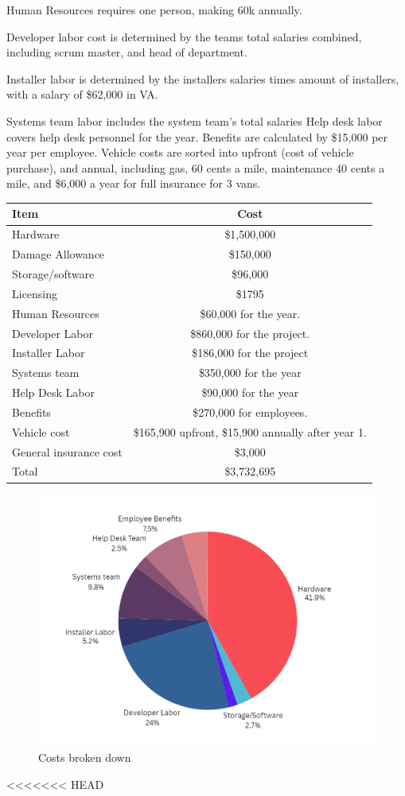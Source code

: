 \documentclass{report}
\begin{document}
Human Resources requires one person, making 60k annually. 

Developer labor cost is determined by the teams total salaries combined, including scrum master, and head of department.

Installer labor is determined by the installers salaries times amount of installers, with a salary of \$62,000 in VA.

Systems team labor includes the system team's total salaries
Help desk labor covers help desk personnel for the year. 
Benefits are calculated by \$15,000 per year per employee.
Vehicle costs are sorted into upfront (cost of vehicle purchase), and annual, 
including gas, 60 cents a mile, maintenance 40 cents a mile, 
and \$6,000 a year for full insurance for 3 vans.

\begin{tabular}{|l|c|}
\hline
Item & Cost \\
\hline
Hardware & \$1,500,000 \\
\hline
Damage Allowance & \$150,000 \\
\hline
Storage/software & \$96,000 \\
\hline
Licensing & \$1795 \\
\hline
Human Resources & \$60,000 for the year. \\
\hline
Developer Labor & \$860,000 for the project. \\
\hline
Installer Labor & \$186,000 for the project \\
\hline
Systems team & \$350,000 for the year \\
\hline
Help Desk Labor & \$90,000 for the year \\
\hline
Benefits & \$270,000 for employees. \\
\hline
Vehicle cost & \$165,900 upfront, \$15,900 annually after year 1. \\
\hline
General insurance cost & \$3,000 \\
\hline
Total & \$3,732,695 \\
\hline
\end{tabular}
\begin{figure}[h]
    \includegraphics[width=\linewidth]{pi_chart.png}
    \caption{Costs broken down}
\end{figure}
<<<<<<< HEAD
\end{document}
